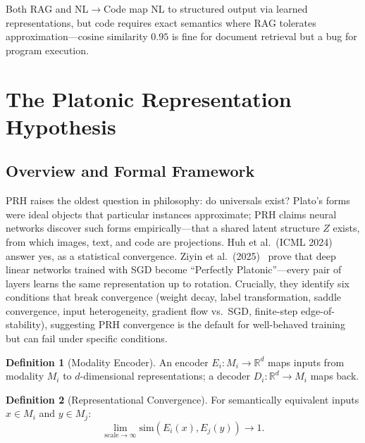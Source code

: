 \documentclass[11pt]{article}
\theoremstyle{definition}
\newtheorem{definition}{Definition}[section]
\begin{document}
Both RAG and NL$\to$Code map NL to structured output via learned representations, but code requires exact semantics where RAG tolerates approximation---cosine similarity $0.95$ is fine for document retrieval but a bug for program execution.


\section{The Platonic Representation Hypothesis}\label{sec:prh}

\subsection{Overview and Formal Framework}

PRH raises the oldest question in philosophy: do universals exist? Plato's forms were ideal objects that particular instances approximate; PRH claims neural networks discover such forms empirically---that a shared latent structure $Z$ exists, from which images, text, and code are projections. Huh et al.\ (ICML 2024)~\cite{huh2024platonic} answer yes, as a statistical convergence. Ziyin et al.\ (2025)~\cite{ziyin2025proof} prove that deep linear networks trained with SGD become ``Perfectly Platonic''---every pair of layers learns the same representation up to rotation. Crucially, they identify six conditions that break convergence (weight decay, label transformation, saddle convergence, input heterogeneity, gradient flow vs.\ SGD, finite-step edge-of-stability), suggesting PRH convergence is the default for well-behaved training but can fail under specific conditions.

\begin{definition}[Modality Encoder]\label{def:encoder}
An encoder $E_i : M_i \to \mathbb{R}^d$ maps inputs from modality $M_i$ to $d$-dimensional representations; a decoder $D_i : \mathbb{R}^d \to M_i$ maps back.
\end{definition}

\begin{definition}[Representational Convergence]\label{def:convergence}
For semantically equivalent inputs $x \in M_i$ and $y \in M_j$:
\[
\lim_{\text{scale}\to\infty} \mathrm{sim}(E_i(x), E_j(y)) \to 1.
\]
\end{definition}
\end{document}
